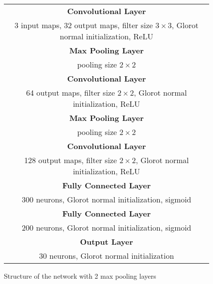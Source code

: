 \begin{figure}[h!]
	\scriptsize
	\centering
	\begin{tabular}{|c|}
	\hline
		\textbf{Convolutional Layer}\\
		3 input maps, 32 output maps, filter size $3\times3$, Glorot normal initialization, \ac{ReLU}\\
	\hline
		\textbf{Max Pooling Layer}\\
		pooling size $2\times2$\\
	\hline
		\textbf{Convolutional Layer}\\
		64 output maps, filter size $2\times2$, Glorot normal initialization, \ac{ReLU}\\
	\hline
		\textbf{Max Pooling Layer}\\
		pooling size $2\times2$\\
	\hline
		\textbf{Convolutional Layer}\\
		128 output maps, filter size $2\times2$, Glorot normal initialization, \ac{ReLU}\\
	\hline
		\textbf{Fully Connected Layer}\\
		300 neurons, Glorot normal initialization, sigmoid\\
	\hline
		\textbf{Fully Connected Layer}\\
		200 neurons, Glorot normal initialization, sigmoid\\
	\hline
		\textbf{Output Layer}\\
		30 neurons, Glorot normal initialization\\
	\hline
	\end{tabular}
	\caption{Structure of the network with 2 max pooling layers}
	\label{fig:structure_of_maxpooling_network}
\end{figure}
